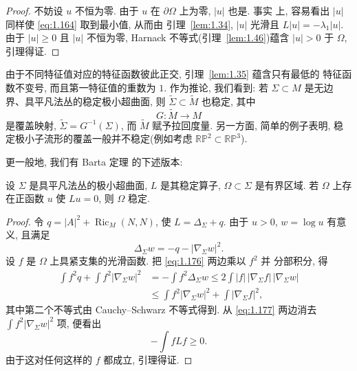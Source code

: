\begin{proof}
不妨设 $u$ 不恒为零. 由于 $u$ 在 $\partial\Omega$ 上为零, $|u|$ 也是. 事实
上, 容易看出 $|u|$ 同样使 \eqref{eq:1.164} 取到最小值, 从而由
引理~\ref{lem:1.34}, $|u|$ 光滑且 $L|u|=-\lambda_1|u|$. 由于 $|u|\geq0$ 且
$|u|$ 不恒为零, Harnack 不等式(引理~\ref{lem:1.46})蕴含 $|u|>0$ 于
$\Omega$, 引理得证.
\end{proof}

由于不同特征值对应的特征函数彼此正交, 引理~\ref{lem:1.35} 蕴含只有最低的
特征函数不变号, 而且第一特征值的重数为 $1$. 作为推论, 我们看到: 若
$\Sigma\subset M$ 是无边界、具平凡法丛的稳定极小超曲面, 则
$\tilde\Sigma\subset\tilde M$ 也稳定, 其中
\begin{equation}
G:\tilde M\to M
\label{eq:1.175}
\end{equation}
是覆盖映射, $\tilde\Sigma=G^{-1}(\Sigma)$, 而 $\tilde M$ 赋予拉回度量.
另一方面, 简单的例子表明, 稳定极小子流形的覆盖一般并不稳定(例如考虑
$\mathbb{RP}^2\subset\mathbb{RP}^3$).

更一般地, 我们有 Barta 定理 \cite{Ba} 的下述版本:

\begin{lemma}
\label{lem:1.36}
设 $\Sigma$ 是具平凡法丛的极小超曲面, $L$ 是其稳定算子,
$\Omega\subset\Sigma$ 是有界区域. 若 $\Omega$ 上存在正函数 $u$ 使 $Lu=0$,
则 $\Omega$ 稳定.
\end{lemma}

\begin{proof}
令 $q=|A|^{2}+\operatorname{Ric}_M(N,N)$, 使 $L=\Delta_{\Sigma}+q$. 由于
$u>0$, $w=\log u$ 有意义, 且满足
\begin{equation}
\Delta_{\Sigma}w=-q-|\nabla_{\Sigma}w|^{2}.
\label{eq:1.176}
\end{equation}
设 $f$ 是 $\Omega$ 上具紧支集的光滑函数. 把 \eqref{eq:1.176} 两边乘以 $f^{2}$ 并
分部积分, 得
\begin{equation}
\begin{aligned}
\int f^{2}q+\int f^{2}|\nabla_{\Sigma}w|^{2}
&=-\int f^{2}\Delta_{\Sigma}w
 \leq2\int|f|\,|\nabla_{\Sigma}f|\,|\nabla_{\Sigma}w|\\
&\leq\int f^{2}|\nabla_{\Sigma}w|^{2}+\int|\nabla_{\Sigma}f|^{2},
\end{aligned}
\label{eq:1.177}
\end{equation}
其中第二个不等式由 Cauchy--Schwarz 不等式得到. 从 \eqref{eq:1.177} 两边消去
$\int f^{2}|\nabla_{\Sigma}w|^{2}$ 项, 便看出
\begin{equation}
-\int fLf\geq0.
\label{eq:1.178}
\end{equation}
由于这对任何这样的 $f$ 都成立, 引理得证.
\end{proof}

